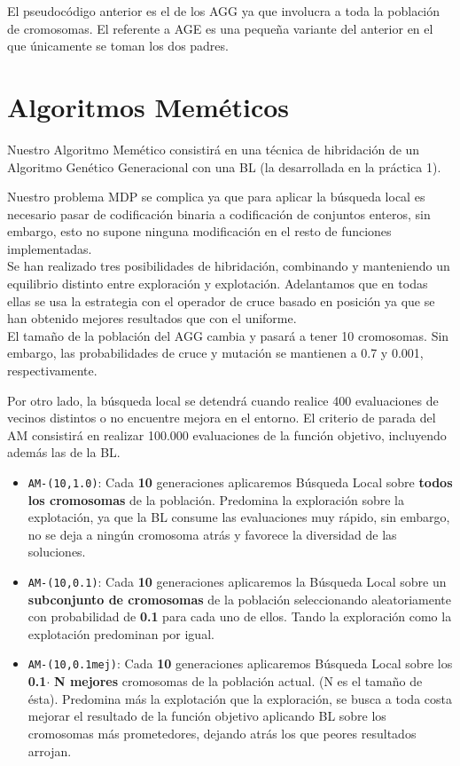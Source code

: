 El pseudocódigo anterior es el de los AGG ya que involucra a toda la población de cromosomas. El referente a AGE es una pequeña variante del anterior en el que únicamente se toman los dos padres.





\newpage 
\section{Algoritmos Meméticos}

\hspace{1.5cm} Nuestro Algoritmo Memético consistirá en una técnica de hibridación de un Algoritmo Genético Generacional con una BL (la desarrollada en la práctica 1).

Nuestro problema MDP se complica ya que para aplicar la búsqueda local es necesario pasar de codificación binaria a codificación de conjuntos enteros, sin embargo, esto no supone ninguna modificación en el resto de funciones implementadas. \\

Se han realizado tres posibilidades de hibridación, combinando y manteniendo un equilibrio distinto entre exploración y explotación.
Adelantamos que en todas ellas se usa la estrategia con el operador de cruce basado en posición ya que se han obtenido mejores resultados que con el uniforme. \\

El tamaño de la población del AGG cambia y pasará a tener 10 cromosomas. Sin embargo, las probabilidades de cruce y mutación se mantienen a 0.7 y 0.001, respectivamente.



Por otro lado, la búsqueda local se detendrá cuando realice 400 evaluaciones de vecinos distintos o no encuentre mejora en el entorno.
El criterio de parada del AM consistirá en realizar 100.000 evaluaciones de la función objetivo, incluyendo además las de la BL.

\begin{itemize}
	\item \texttt{AM-(10,1.0)}:	Cada \textbf{10} generaciones aplicaremos Búsqueda Local sobre \textbf{todos los cromosomas} de la población. Predomina la exploración sobre la explotación, ya que la BL consume las evaluaciones muy rápido, sin embargo, no se deja a ningún cromosoma atrás y favorece la diversidad de las soluciones.
	\item \texttt{AM-(10,0.1)}:	Cada \textbf{10} generaciones aplicaremos la Búsqueda Local sobre un \textbf{subconjunto de cromosomas} de la población seleccionando aleatoriamente con probabilidad de \textbf{0.1} para cada uno de ellos. Tando la exploración como la explotación predominan por igual.
	\item \texttt{AM-(10,0.1mej)}: Cada \textbf{10} generaciones aplicaremos Búsqueda Local sobre los \textbf{0.1}$\cdot$ \textbf{N mejores} cromosomas de la población actual. (N es el tamaño de ésta). Predomina más la explotación que la exploración, se busca a toda costa mejorar el resultado de la función objetivo aplicando BL sobre los cromosomas más prometedores, dejando atrás los que peores resultados arrojan.
\end{itemize}


